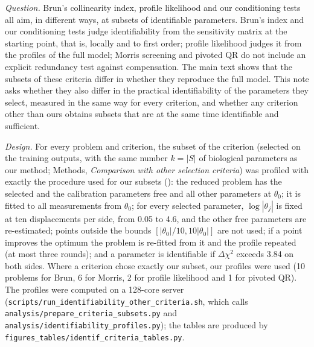

\emph{Question.} Brun's collinearity index, profile likelihood and our conditioning tests all aim, in different ways, at subsets of identifiable parameters. Brun's index and our conditioning tests judge identifiability from the sensitivity matrix at the starting point, that is, locally and to first order; profile likelihood judges it from the profiles of the full model; Morris screening and pivoted QR do not include an explicit redundancy test against compensation. The main text shows that the subsets of these criteria differ in whether they reproduce the full model. This note asks whether they also differ in the practical identifiability of the parameters they select, measured in the same way for every criterion, and whether any criterion other than ours obtains subsets that are at the same time identifiable and sufficient.

\emph{Design.} For every problem and criterion, the subset of the criterion (selected on the training outputs, with the same number $k=|S|$ of biological parameters as our method; Methods, \emph{Comparison with other selection criteria}) was profiled with exactly the procedure used for our subsets (): the reduced problem has the selected and the calibration parameters free and all other parameters at $\theta_0$; it is fitted to all measurements from $\theta_0$; for every selected parameter, $\log|\theta_j|$ is fixed at ten displacements per side, from 0.05 to 4.6, and the other free parameters are re-estimated; points outside the bounds $[|\theta_0|/10,10|\theta_0|]$ are not used; if a point improves the optimum the problem is re-fitted from it and the profile repeated (at most three rounds); and a parameter is identifiable if $\Delta\chi^2$ exceeds 3.84 on both sides. Where a criterion chose exactly our subset, our profiles were used (10 problems for Brun, 6 for Morris, 2 for profile likelihood and 1 for pivoted QR). The profiles were computed on a 128-core server (\texttt{scripts/run\_identifiability\_other\_criteria.sh}, which calls \texttt{analysis/prepare\_criteria\_subsets.py} and \texttt{analysis/identifiability\_profiles.py}); the tables are produced by \texttt{figures\_tables/identif\_criteria\_tables.py}.

